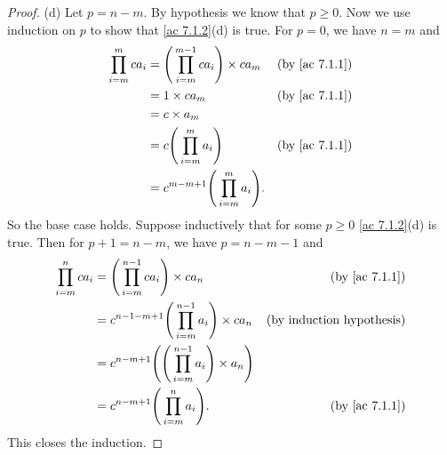 \begin{proof}{(d)}
  Let \(p = n - m\).
  By hypothesis we know that \(p \geq 0\).
  Now we use induction on \(p\) to show that \cref{ac 7.1.2}(d) is true.
  For \(p = 0\), we have \(n = m\) and
  \begin{align*}
    \prod_{i = m}^m ca_i & = \Bigg(\prod_{i = m}^{m - 1} ca_i\Bigg) \times ca_m & \text{(by \cref{ac 7.1.1})} \\
                         & = 1 \times ca_m                                      & \text{(by \cref{ac 7.1.1})} \\
                         & = c \times a_m                                                                     \\
                         & = c \Bigg(\prod_{i = m}^m a_i\Bigg)                  & \text{(by \cref{ac 7.1.1})} \\
                         & = c^{m - m + 1} \Bigg(\prod_{i = m}^m a_i\Bigg).
  \end{align*}
  So the base case holds.
  Suppose inductively that for some \(p \geq 0\) \cref{ac 7.1.2}(d) is true.
  Then for \(p + 1 = n - m\), we have \(p = n - m - 1\) and
  \begin{align*}
    \prod_{i = m}^n ca_i & = \Bigg(\prod_{i = m}^{n - 1} ca_i\Bigg) \times ca_n                         & \text{(by \cref{ac 7.1.1})}      \\
                         & = c^{n - 1 - m + 1} \Bigg(\prod_{i = m}^{n - 1} a_i\Bigg) \times ca_n        & \text{(by induction hypothesis)} \\
                         & = c^{n - m + 1} \Bigg(\Bigg(\prod_{i = m}^{n - 1} a_i\Bigg) \times a_n\Bigg)                                    \\
                         & = c^{n - m + 1} \Bigg(\prod_{i = m}^n a_i\Bigg).                             & \text{(by \cref{ac 7.1.1})}
  \end{align*}
  This closes the induction.
\end{proof}

